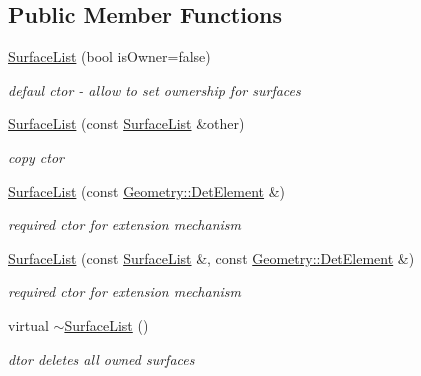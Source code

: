 \subsection*{Public Member Functions}
\begin{DoxyCompactItemize}
\item 
\hyperlink{class_d_d4hep_1_1_d_d_rec_1_1_surface_list_abc669093649a9e2714176cd2162f75b5}{Surface\+List} (bool is\+Owner=false)
\begin{DoxyCompactList}\small\item\em defaul c\textquotesingle{}tor -\/ allow to set ownership for surfaces \end{DoxyCompactList}\item 
\hyperlink{class_d_d4hep_1_1_d_d_rec_1_1_surface_list_a0815581e1cd48827919bd78fdc01107c}{Surface\+List} (const \hyperlink{class_d_d4hep_1_1_d_d_rec_1_1_surface_list}{Surface\+List} \&other)
\begin{DoxyCompactList}\small\item\em copy c\textquotesingle{}tor \end{DoxyCompactList}\item 
\hyperlink{class_d_d4hep_1_1_d_d_rec_1_1_surface_list_af1e802fd9aee21769c7ff3a3ed7f2e65}{Surface\+List} (const \hyperlink{class_d_d4hep_1_1_geometry_1_1_det_element}{Geometry\+::\+Det\+Element} \&)
\begin{DoxyCompactList}\small\item\em required c\textquotesingle{}tor for extension mechanism \end{DoxyCompactList}\item 
\hyperlink{class_d_d4hep_1_1_d_d_rec_1_1_surface_list_a1655044af6ad83e5d51e8513718a8f34}{Surface\+List} (const \hyperlink{class_d_d4hep_1_1_d_d_rec_1_1_surface_list}{Surface\+List} \&, const \hyperlink{class_d_d4hep_1_1_geometry_1_1_det_element}{Geometry\+::\+Det\+Element} \&)
\begin{DoxyCompactList}\small\item\em required c\textquotesingle{}tor for extension mechanism \end{DoxyCompactList}\item 
virtual \hyperlink{class_d_d4hep_1_1_d_d_rec_1_1_surface_list_a8ba1884b4e65fbd42703cb8059cb0fb2}{$\sim$\+Surface\+List} ()
\begin{DoxyCompactList}\small\item\em d\textquotesingle{}tor deletes all owned surfaces \end{DoxyCompactList}\end{DoxyCompactItemize}
